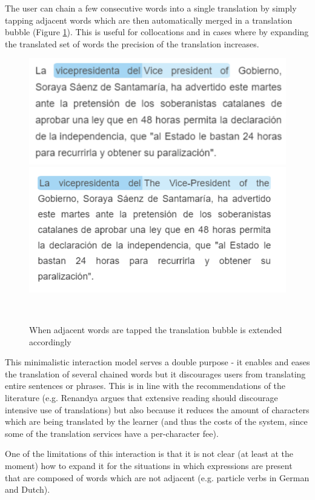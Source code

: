 The user can chain a few consecutive words into a single translation by simply tapping adjacent words which are then automatically merged in a translation bubble (Figure \ref{fig:translation_extension}). This is useful for collocations and in cases where by expanding the translated set of words the precision of the translation increases. 

    \begin{figure}[h!]
    \centering
      \includegraphics[width=0.7\columnwidth]{figures/translated_words1}
      \includegraphics[width=0.7\columnwidth]{figures/translated_words2}
      \caption{When adjacent words are tapped the translation bubble is extended accordingly}~\label{fig:translation_extension}
    \end{figure}

This minimalistic interaction model serves a double purpose - it enables and eases the translation of several chained words but it discourages users from translating entire sentences or phrases. This is in line with the recommendations of the literature (e.g. Renandya argues that extensive reading should discourage intensive use of translations\cite{renadya07-power}) but also because it reduces the amount of characters which are being translated by the learner (and thus the costs of the system, since some of the translation services have a per-character fee). 

One of the limitations of this interaction is that it is not clear (at least at the moment) how to expand it for the situations in which expressions are present that are composed of words which are not adjacent (e.g. particle verbs in German and Dutch).


